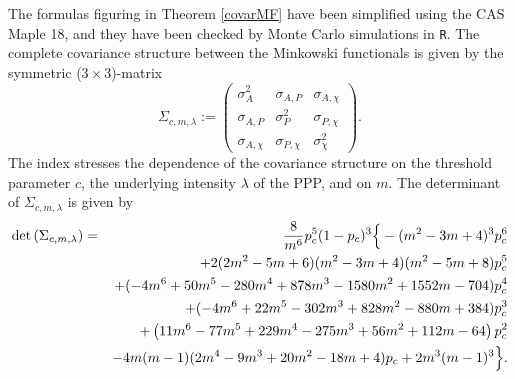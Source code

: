 \documentclass[12pt]{article}
\begin{document}
The formulas figuring in Theorem \ref{covarMF} have been simplified using the CAS Maple 18, and they have been checked by Monte Carlo simulations in {\tt R}. The complete covariance structure between the Minkowski functionals is given by the symmetric ($3\times 3$)-matrix
\begin{equation*}
\Sigma_{c,m,\lambda}:=\left(\begin{array}{ccc}\sigma^2_A & \sigma_{A,P} & \sigma_{A,\chi}\\
\sigma_{A,P} & \sigma^2_{P} & \sigma_{P,\chi}\\
\sigma_{A,\chi} & \sigma_{P,\chi} & \sigma^2_\chi
\end{array}\right).
\end{equation*}
The index stresses the dependence of the covariance structure on the threshold parameter $c$, the underlying intensity $\lambda$ of the PPP, and on $m$. The determinant of $\Sigma_{c,m,\lambda}$ is given by
\begin{eqnarray*}
\det\left(\Sigma_{c,m,\lambda}\right)&=&\frac8{m^6}p_c^5(1-p_c)^3\Big{\{}-(m^2-3m+4)^3p_c^6\\
&&+2(2m^2-5m+6)(m^2-3m+4)(m^2-5m+8)p_c^5\\
&&+(-4m^6+50m^5-280m^4+878m^3-1580m^2+1552m-704)p_c^4\\
&&+(-4m^6+22m^5-302m^3+828m^2-880m+384)p_c^3\\
&&+\left(11m^6-77m^5+229m^4-275m^3+56m^2+112m-64\right)p_c^2\\
&& -4m(m-1)(2m^4-9m^3+20m^2-18m+4)p_c+2m^3(m-1)^3\Big{\}}.
\end{eqnarray*}

\end{document}
